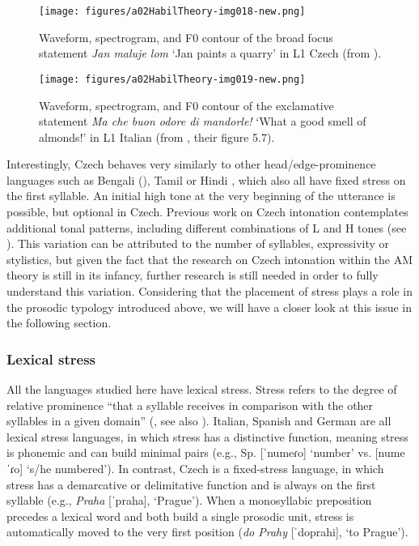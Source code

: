 \begin{figure}
\texttt{[image: figures/a02HabilTheory-img018-new.png]}



\caption{Waveform, spectrogram, and F0 contour of the broad focus statement \textit{Jan maluje lom} ‘Jan paints a quarry’ in L1 Czech (from \citealt{PeškováForthcoming}).}
\label{fig:2.12}
\end{figure}



\begin{figure}
\texttt{[image: figures/a02HabilTheory-img019-new.png]}



\caption{Waveform, spectrogram, and F0 contour of the exclamative statement \textit{Ma che buon odore di mandorle!} ‘What a good smell of almonds!’ in L1 Italian (from  \citealt[165]{GiliFivelaEtAl2015}, their figure 5.7).}
\label{fig:2.13}
\end{figure}

Interestingly, Czech behaves very similarly to other head/edge-prominence languages such as Bengali (\citealt{HayesLahiri1991, Khan2014}), Tamil \citep{Keane2014} or Hindi \citep{PatilEtAl2008}, which also all have fixed stress on the first syllable. An initial high tone at the very beginning of the utterance is possible, but optional in Czech. Previous work on Czech intonation contemplates additional tonal patterns, including different combinations of L and H tones (see \citealt{Palková1994, Duběda2014}). This variation can be attributed to the number of syllables, expressivity or stylistics, but given the fact that the research on Czech intonation within the AM theory is still in its infancy, further research is still needed in order to fully understand this variation. Considering that the placement of stress plays a role in the prosodic typology introduced above, we will have a closer look at this issue in the following section.

\subsubsection{Lexical stress}\label{sec:2.3.2.2}

All the languages studied here have lexical stress. Stress refers to the degree of relative prominence “that a syllable receives in comparison with the other syllables in a given domain” (\citealt[220]{Hualde2005}, see also  \citealt{GoedemansvanderHulst2013}). Italian, Spanish and German are all lexical stress languages, in which stress has a distinctive function, meaning stress is phonemic and can build minimal pairs (e.g., Sp. [ˈnumeɾo] ‘number’ vs. [numeˈɾo] ‘s/he numbered’). In contrast, Czech is a fixed-stress language, in which stress has a demarcative or delimitative function and is always on the first syllable (e.g., \textit{Praha} [ˈpraha], ‘Prague’). When a monosyllabic preposition precedes a lexical word and both build a single prosodic unit, stress is automatically moved to the very first position (\textit{do Prahy} [ˈdoprahi], ‘to Prague’).



